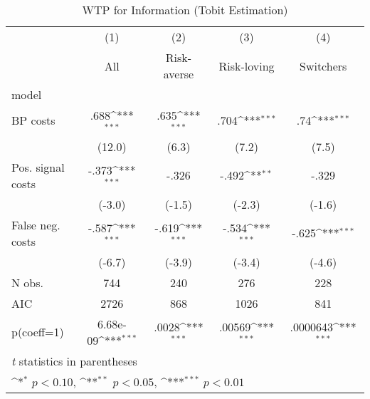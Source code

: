 \begin{table}[htbp]\centering
\def\sym#1{\ifmmode^{#1}\else\(^{#1}\)\fi}
\caption{WTP for Information (Tobit Estimation)}
\begin{tabular}{l*{4}{c}}
\hline\hline
                &\multicolumn{1}{c}{(1)}&\multicolumn{1}{c}{(2)}&\multicolumn{1}{c}{(3)}&\multicolumn{1}{c}{(4)}\\
                &\multicolumn{1}{c}{All}&\multicolumn{1}{c}{Risk-averse}&\multicolumn{1}{c}{Risk-loving}&\multicolumn{1}{c}{Switchers}\\
\hline
model           &                  &                  &                  &                  \\
BP costs        &     .688\sym{***}&     .635\sym{***}&     .704\sym{***}&      .74\sym{***}\\
                &   (12.0)         &    (6.3)         &    (7.2)         &    (7.5)         \\
Pos. signal costs&    -.373\sym{***}&    -.326         &    -.492\sym{**} &    -.329         \\
                &   (-3.0)         &   (-1.5)         &   (-2.3)         &   (-1.6)         \\
False neg. costs&    -.587\sym{***}&    -.619\sym{***}&    -.534\sym{***}&    -.625\sym{***}\\
                &   (-6.7)         &   (-3.9)         &   (-3.4)         &   (-4.6)         \\
\hline
N obs.          &      744         &      240         &      276         &      228         \\
AIC             &     2726         &      868         &     1026         &      841         \\
p(coeff=1)      & 6.68e-09\sym{***}&    .0028\sym{***}&   .00569\sym{***}& .0000643\sym{***}\\
\hline\hline
\multicolumn{5}{l}{\footnotesize \textit{t} statistics in parentheses}\\
\multicolumn{5}{l}{\footnotesize \sym{*} \(p<0.10\), \sym{**} \(p<0.05\), \sym{***} \(p<0.01\)}\\
\end{tabular}
\end{table}
